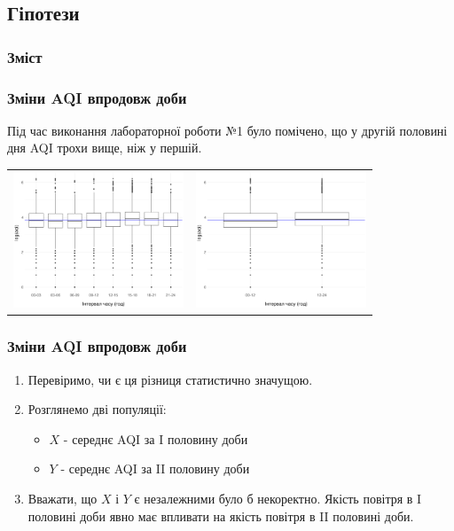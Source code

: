 \documentclass{beamer}
\begin{document}

\begin{frame}
  \section{Гіпотези}

  \frametitle{Зміст}
  \tableofcontents[currentsection]
\end{frame}

\begin{frame}
  \frametitle{Зміни AQI впродовж доби}

  Під час виконання лабораторної роботи №1 було помічено,
  що у другій половині дня AQI трохи вище, ніж у першій. 

  \begin{center}
    \begin{tabular}{cc}
      \includegraphics[width=2in]{./plots/lab2/hypotheses/daytime_3hr_vs_aqi.png} &
      \includegraphics[width=2in]{./plots/lab2/hypotheses/daytime_12hr_vs_aqi.png}
    \end{tabular}
  \end{center}
\end{frame}

\begin{frame}[fragile=singleslide]
  \frametitle{Зміни AQI впродовж доби}

  \begin{enumerate}
    \item Перевіримо, чи є ця різниця статистично значущою.
    \item Розглянемо дві популяції:

      \begin{itemize}
        \item $X$ - середнє AQI за I половину доби
        \item $Y$ - середнє AQI за II половину доби
      \end{itemize}
    \item Вважати, що $X$ і $Y$ є незалежними було б некоректно. 
    Якість повітря в I половині доби явно має впливати на 
    якість повітря в II половині доби.
  \end{enumerate}
\end{frame}
\end{document}
